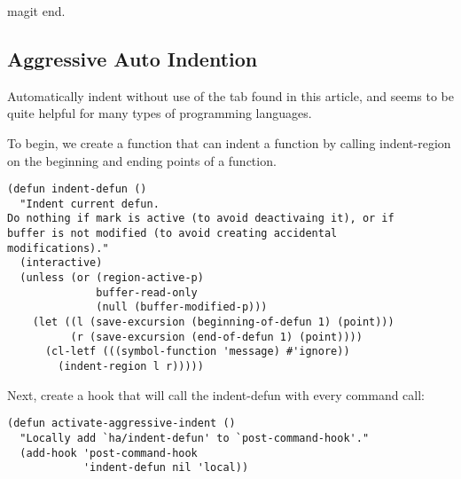 \documentclass[12pt]{article}
\begin{document}
magit end. 
\subsection{Aggressive Auto Indention}
\label{sec:orgb88a9cc}

Automatically indent without use of the tab found in this article, and seems to be quite helpful for many types of programming languages.

To begin, we create a function that can indent a function by calling indent-region on the beginning and ending points of a function.
\begin{verbatim}
(defun indent-defun ()
  "Indent current defun.
Do nothing if mark is active (to avoid deactivaing it), or if
buffer is not modified (to avoid creating accidental
modifications)."
  (interactive)
  (unless (or (region-active-p)
              buffer-read-only
              (null (buffer-modified-p)))
    (let ((l (save-excursion (beginning-of-defun 1) (point)))
          (r (save-excursion (end-of-defun 1) (point))))
      (cl-letf (((symbol-function 'message) #'ignore))
        (indent-region l r)))))
\end{verbatim}

Next, create a hook that will call the indent-defun with every command call:

\begin{verbatim}
(defun activate-aggressive-indent ()
  "Locally add `ha/indent-defun' to `post-command-hook'."
  (add-hook 'post-command-hook
            'indent-defun nil 'local))
\end{verbatim}
\end{document}
